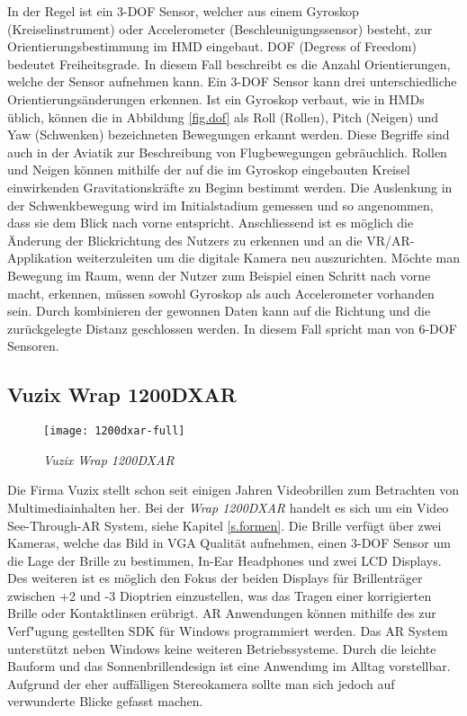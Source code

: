  In der Regel ist ein 3-DOF Sensor, welcher aus einem Gyroskop (Kreiselinstrument) oder Accelerometer (Beschleunigungssensor) besteht, zur Orientierungsbestimmung im HMD eingebaut. DOF (Degress of Freedom) bedeutet Freiheitsgrade. In diesem Fall beschreibt es die Anzahl Orientierungen, welche der Sensor aufnehmen kann. Ein 3-DOF Sensor kann drei unterschiedliche Orientierungsänderungen erkennen. Ist ein Gyroskop verbaut, wie in HMDs üblich, können die in Abbildung \ref{fig.dof} als Roll (Rollen), Pitch (Neigen) und Yaw (Schwenken) bezeichneten Bewegungen erkannt werden. Diese Begriffe sind auch in der Aviatik zur Beschreibung von Flugbewegungen gebräuchlich. Rollen und Neigen können mithilfe der auf die im Gyroskop eingebauten Kreisel einwirkenden Gravitationskräfte zu Beginn bestimmt werden. Die Auslenkung in der Schwenkbewegung wird im Initialstadium gemessen und so angenommen, dass sie dem Blick nach vorne entspricht. Anschliessend ist es möglich die Änderung der Blickrichtung des Nutzers zu erkennen und an die VR/AR-Applikation weiterzuleiten um die digitale Kamera neu auszurichten. Möchte man Bewegung im Raum, wenn der Nutzer zum Beispiel einen Schritt nach vorne macht, erkennen, müssen sowohl Gyroskop als auch Accelerometer vorhanden sein. Durch kombinieren der gewonnen Daten kann auf die Richtung und die zurückgelegte Distanz geschlossen werden. In diesem Fall spricht man von 6-DOF Sensoren.\cite{website:dof}
\subsection*{Vuzix Wrap 1200DXAR}
\begin{wrapfigure}{r}{0.5\textwidth}
	\vspace{-20pt}
	\begin{center}
		\texttt{[image: 1200dxar-full]}
	\end{center}
	\vspace{-15pt}
	\caption{\textit{Vuzix Wrap 1200DXAR}}\label{vuzixgraphic}
	\vspace{-12pt}
\end{wrapfigure}
Die Firma Vuzix stellt schon seit einigen Jahren Videobrillen zum Betrachten von Multimediainhalten her. Bei der \textit{Wrap 1200DXAR} handelt es sich um ein Video See-Through-AR System, siehe Kapitel \ref{s.formen}. Die Brille verfügt über zwei Kameras, welche das Bild in VGA Qualität aufnehmen, einen 3-DOF Sensor um die Lage der Brille zu bestimmen, In-Ear Headphones und zwei LCD Displays. Des weiteren ist es möglich den Fokus der beiden Displays für Brillenträger zwischen +2 und -3 Dioptrien einzustellen, was das Tragen einer korrigierten Brille oder Kontaktlinsen erübrigt. AR Anwendungen können mithilfe des zur Verf"ugung gestellten SDK für Windows programmiert werden. Das AR System unterstützt neben Windows keine weiteren Betriebssysteme. Durch die leichte Bauform und das Sonnenbrillendesign ist eine Anwendung im Alltag vorstellbar. Aufgrund der eher auffälligen Stereokamera sollte man sich jedoch auf verwunderte Blicke gefasst machen. \cite{website:vuzix}
\newpage
